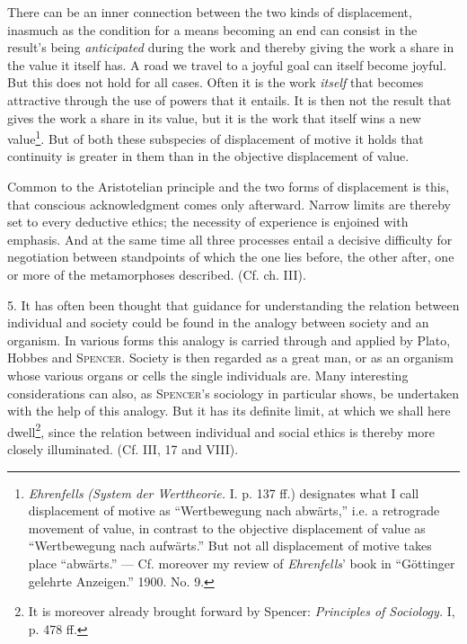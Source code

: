 \documentclass[12pt,a4paper,openany]{book}
\newcommand{\opage}[1]{\marginnote{\footnotesize\textit{[#1]}}}
\begin{document}
There can be an inner connection between the two kinds of displacement, inasmuch as the condition for a means becoming
an end can consist in the result's being \textit{anticipated} during the work and thereby giving the work a share in the value
it itself has. A road we travel to a joyful goal can itself become joyful. But this does not hold for all cases. Often
it is the work \textit{itself} that becomes attractive through the use of powers that it entails. It is then not the
result that gives the work a share in its value, but it is the work that itself wins a new value\footnote[1]{\emph{Ehrenfells} %
\textit{(System der Werttheorie.} I. p. 137 ff.) designates what I call displacement of motive as ``Wertbewegung nach
abwärts,'' i.e. a retrograde movement of value, in contrast to the objective displacement of value as ``Wertbewegung
nach aufwärts.'' But not all displacement of motive takes place ``abwärts.'' --- Cf. moreover my review of
\emph{Ehrenfells}' book in ``Göttinger gelehrte Anzeigen.'' 1900. No. 9.}. But of
\opage{272}both these subspecies of displacement of motive it holds that continuity is greater in them than in the
objective displacement of value.

Common to the Aristotelian principle and the two forms of displacement is this, that conscious acknowledgment comes only
afterward. Narrow limits are thereby set to every deductive ethics; the necessity of experience is enjoined with
emphasis. And at the same time all three processes entail a decisive difficulty for negotiation between standpoints of
which the one lies before, the other after, one or more of the metamorphoses described. (Cf. ch. III).

5. It has often been thought that guidance for understanding the relation between individual and society could be found
in the analogy between society and an organism. In various forms this analogy is carried through and applied by Plato,
Hobbes and \textsc{Spencer}. Society is then regarded as a great man, or as an organism whose various organs or cells
the single individuals are. Many interesting considerations can also, as \textsc{Spencer}'s sociology in particular
shows, be undertaken with the help of this analogy. But it has its definite limit, at which we shall here
dwell\footnote[1]{It is moreover already brought forward by Spencer: \textit{Principles of Sociology.} I, p. 478 ff.},
since the relation between individual and social ethics is thereby more closely illuminated. (Cf. III, 17 and VIII).
\end{document}
